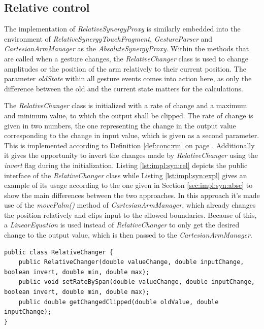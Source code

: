 \subsection{Relative control}

The implementation of \textit{RelativeSynergyProxy} is similarly embedded into the environment of \textit{RelativeSynergyTouchFragment}, \textit{GestureParser} and \textit{CartesianArmManager} as the \textit{AbsoluteSynergyProxy}. Within the methods that are called when a gesture changes, the \textit{RelativeChanger} class is used to change amplitudes or the position of the arm relatively to their current position. The parameter \textit{oldState} within all gesture events comes into action here, as only the difference between the old and the current state matters for the calculations. 

The \textit{RelativeChanger} class is initialized with a rate of change and a maximum and minimum value, to which the output shall be clipped. The rate of change is given in two numbers, the one representing the change in the output value corresponding to the change in input value, which is given as a second parameter. This is implemented according to Definition \ref{def:conc:rm} on page \pageref{def:conc:rm}. Additionally it gives the opportunity to invert the changes made by \textit{RelativeChanger} using the \textit{invert} flag during the initialization. Listing \ref{lst:impl:syn:rel} depicts the public interface of the \textit{RelativeChanger} class while Listing \ref{lst:impl:syn:expl} gives an example of its usage according to the one given in Section \ref{sec:impl:syn:absc} to show the main differences between the two approaches. In this approach it's made use of the \textit{movePalm()} method of \textit{CartesianArmManager}, which already changes the position relatively and clips input to the allowed boundaries. Because of this, a \textit{LinearEquation} is used instead of \textit{RelativeChanger} to only get the desired change to the output value, which is then passed to the \textit{CartesianArmManager}.

\begin{lstlisting}[caption={Public interface of the RelativeChanger class},label=lst:impl:syn:rel]
public class RelativeChanger {
	public RelativeChanger(double valueChange, double inputChange, boolean invert, double min, double max);
	public void setRateBySpan(double valueChange, double inputChange, boolean invert, double min, double max);
	public double getChangedClipped(double oldValue, double inputChange);
}
\end{lstlisting}

